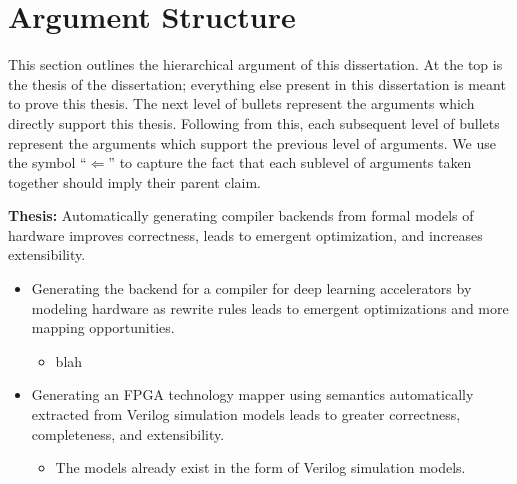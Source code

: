 \section{Argument Structure}

This section outlines the hierarchical
  argument
  of this dissertation.
At the top is the 
  thesis of the dissertation;
  everything else present
  in this dissertation
  is meant to prove this thesis.
The next level of bullets
  represent the arguments
  which directly support this thesis.
Following from this,
  each subsequent level of bullets
  represent the arguments
  which support the previous level of
  arguments.
We use the symbol ``$\Leftarrow$''
  to capture the fact that
  each sublevel of arguments
  taken together
  should imply their parent claim.
  
  

\textbf{Thesis:}
  Automatically generating
  compiler backends
  from formal models of hardware
  improves correctness,
  leads to emergent optimization,
  and increases extensibility.
\begin{itemize}[label=$\Leftarrow$]
 \item Generating the backend
      for a compiler for deep learning
      accelerators
      by modeling hardware
      as rewrite rules
      leads to
      emergent optimizations
      and more mapping opportunities.
 \begin{itemize}[label=$\Leftarrow$]
  \item blah
 \end{itemize}
 \item Generating an FPGA technology
   mapper
   using semantics
   automatically extracted
   from Verilog simulation models
   leads to greater correctness,
   completeness,
   and extensibility.
    \begin{itemize}
        \item The models already exist in the form of Verilog simulation models.
    \end{itemize}
\end{itemize}